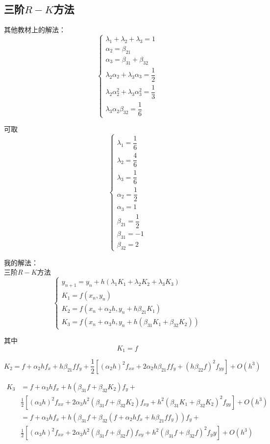 \documentclass{article}
\begin{document}
\begin{CJK*}{UTF8}{gbsn}

\section{三阶$R-K$方法}
其他教材上的解法：
\[
\begin{cases}
\lambda_1 + \lambda_2 + \lambda_3 = 1 \\
\alpha_2 = \beta_{21} \\
\alpha_3 = \beta_{31} + \beta_{32} \\
\lambda_2\alpha_2 + \lambda_3\alpha_3 = \dfrac{1}{2} \\
\lambda_2\alpha_2^2 + \lambda_3\alpha_3^2 = \dfrac{1}{3} \\
\lambda_3\alpha_2\beta_{32} = \dfrac{1}{6}
\end{cases}
\]

可取
\[
\begin{cases}
\lambda_1 = \dfrac{1}{6} \\
\lambda_2 = \dfrac{4}{6} \\
\lambda_3 = \dfrac{1}{6} \\
\alpha_2 = \dfrac{1}{2} \\
\alpha_3 = 1 \\
\beta_{21} = \dfrac{1}{2} \\
\beta_{31} = -1 \\
\beta_{32} = 2
\end{cases}
\]

我的解法： \\
三阶$R-K$方法
\[
\begin{cases}
y_{n + 1} = y_n + h(\lambda_1K_1 + \lambda_2K_2 + \lambda_3K_3) \\
K_1 = f(x_n, y_n) \\
K_2 = f(x_n + \alpha_2h, y_n + h\beta_{21}K_1) \\
K_3 = f(x_n + \alpha_3h, y_n + h(\beta_{31}K_1 + \beta_{32}K_2))
\end{cases}
\]

其中
\[ 
K_1 = f
\]

\[
K_2 = f + \alpha_2hf_x + h\beta_{21}ff_y + \frac{1}{2}\left[ (\alpha_2h)^2f_{xx} + 2\alpha_2h\beta_{21}ff_y + (h\beta_{22}f)^2f_{yy} \right] + O(h^3)
\]

\[
\begin{aligned}
K_3 &= f + \alpha_3hf_x + h(\beta_{31}f + \beta_{32}K_2)f_y + \\
& \frac{1}{2}\left[ (\alpha_3h)^2 f_{xx} + 2\alpha_3h^2(\beta_{31}f + \beta_{32}K_2)f_{xy} + h^2(\beta_{31}K_1 + \beta_{32}K_2)^2f_{yy} \right] + O(h^3) \\
&= f + \alpha_3hf_x + h(\beta_{31}f + \beta_{32}(f + \alpha_2hf_x + h\beta_{21}ff_y))f_y + \\
& \frac{1}{2}\left[ (\alpha_3h)^2f_{xx} + 2\alpha_3h^2(\beta_{31}f + \beta_{32}f)f_{xy} + h^2(\beta_{31}f + \beta_{32}f)^2f_yy \right] + O(h^3)
\end{aligned}
\]


\end{CJK*}
\end{document}
